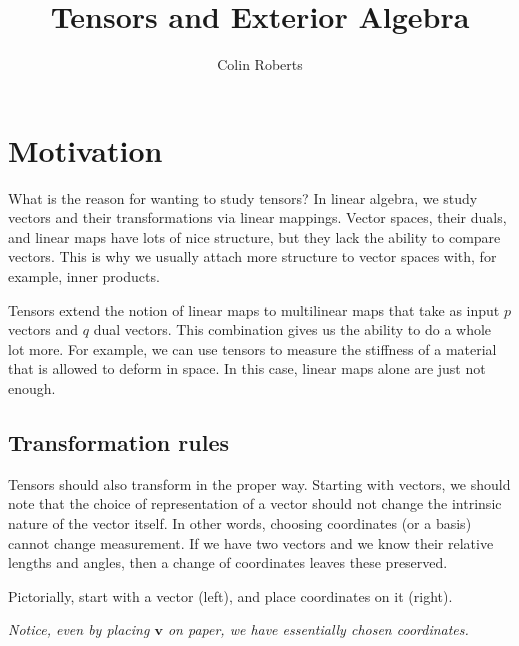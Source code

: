 \documentclass[12pt]{article}
\title{Tensors and Exterior Algebra}
\author{Colin Roberts}
\theoremstyle{definition}
\begin{document}
\maketitle

\section{Motivation}
What is the reason for wanting to study tensors?  In linear algebra, we study vectors and their transformations via linear mappings.  Vector spaces, their duals, and linear maps have lots of nice structure, but they lack the ability to compare vectors.  This is why we usually attach more structure to vector spaces with, for example, inner products.

Tensors extend the notion of linear maps to multilinear maps that take as input $p$ vectors and $q$ dual vectors.  This combination gives us the ability to do a whole lot more.  For example, we can use tensors to measure the stiffness of a material that is allowed to deform in space.  In this case, linear maps alone are just not enough.

\subsection{Transformation rules}
Tensors should also transform in the proper way.  Starting with vectors, we should note that the choice of representation of a vector should not change the intrinsic nature of the vector itself.  In other words, choosing coordinates (or a basis) cannot change measurement.  If we have two vectors and we know their relative lengths and angles, then a change of coordinates leaves these preserved.

Pictorially, start with a vector (left), and place coordinates on it (right).
        \begin{center}
        \hspace*{3cm}
        \end{center}
\emph{Notice, even by placing $\mathbf{v}$ on paper, we have essentially chosen coordinates.} 
\end{document}
